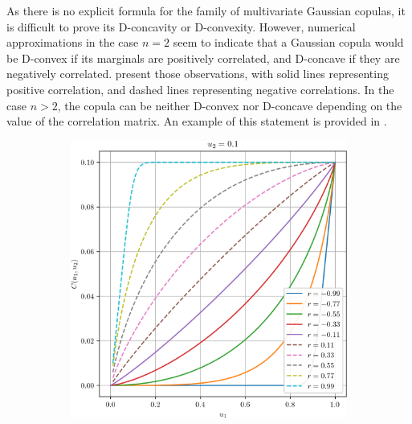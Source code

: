\begin{remark}
    As there is no explicit formula for the family of multivariate Gaussian copulas, it is difficult to prove its D-concavity or D-convexity. However, numerical approximations in the case $n=2$ seem to indicate that a Gaussian copula would be D-convex if its marginals are positively correlated, and D-concave if they are negatively correlated.  present those observations, with solid lines representing positive correlation, and dashed lines representing negative correlations. In the case $n>2$, the copula can be neither D-convex nor D-concave depending on the value of the correlation matrix. An example of this statement is provided in .
\end{remark}

\begin{figure}
    \centering
    \begin{subfigure}{0.4\linewidth}
        \centering
        \includegraphics[width=\linewidth]{Images/Chap_2/Gaussian_copula/gaussian_copula_0.png}
    \end{subfigure}\hfill
    \begin{subfigure}{0.4\linewidth}
        \centering

\end{subfigure}
\end{figure}
